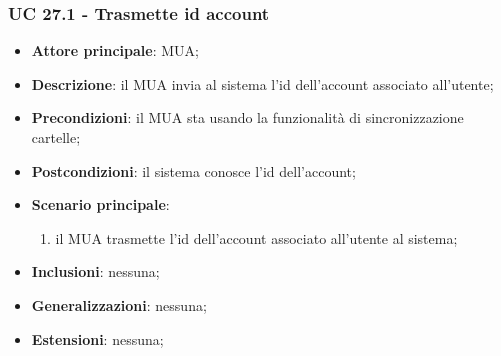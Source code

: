     \subsubsection{UC 27.1 - Trasmette id account} \label{sec:UC27.1}
    \begin{itemize}
        \item \textbf{Attore principale}: MUA;
        \item \textbf{Descrizione}: il MUA invia al sistema l'id dell'account associato all'utente;
        \item \textbf{Precondizioni}: il MUA sta usando la funzionalità di sincronizzazione cartelle;
        \item \textbf{Postcondizioni}: il sistema conosce l'id dell'account;
        \item \textbf{Scenario principale}:
            \begin{enumerate}
                \item il MUA trasmette l'id dell'account associato all'utente al sistema;
            \end{enumerate}
        \item \textbf{Inclusioni}: nessuna;
        \item \textbf{Generalizzazioni}: nessuna;
        \item \textbf{Estensioni}: nessuna;
    \end{itemize}

